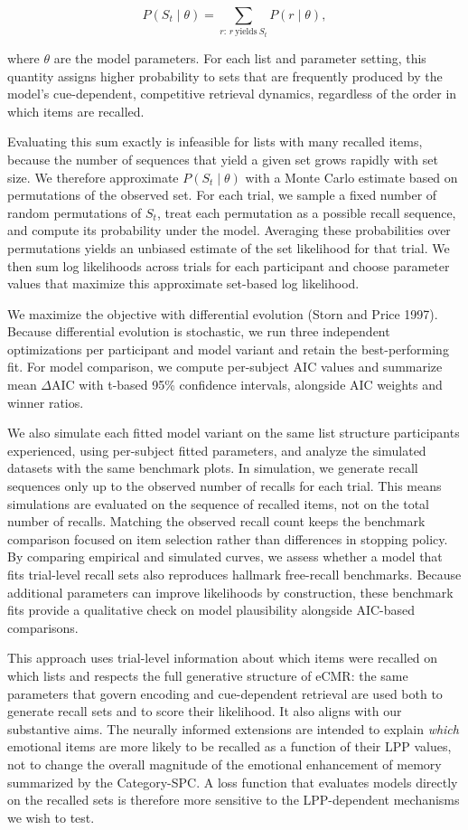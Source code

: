 \documentclass[
  letterpaper,
  DIV=11,
  numbers=noendperiod]{scrartcl}
\begin{document}
\[
P(S_t \mid \theta) = \sum_{r:\, r\ \text{yields}\ S_t} P(r \mid \theta),
\]

where \(\theta\) are the model parameters. For each list and parameter
setting, this quantity assigns higher probability to sets that are
frequently produced by the model's cue-dependent, competitive retrieval
dynamics, regardless of the order in which items are recalled.

Evaluating this sum exactly is infeasible for lists with many recalled
items, because the number of sequences that yield a given set grows
rapidly with set size. We therefore approximate \(P(S_t \mid \theta)\)
with a Monte Carlo estimate based on permutations of the observed set.
For each trial, we sample a fixed number of random permutations of
\(S_t\), treat each permutation as a possible recall sequence, and
compute its probability under the model. Averaging these probabilities
over permutations yields an unbiased estimate of the set likelihood for
that trial. We then sum log likelihoods across trials for each
participant and choose parameter values that maximize this approximate
set-based log likelihood.

We maximize the objective with differential evolution (Storn and Price
1997). Because differential evolution is stochastic, we run three
independent optimizations per participant and model variant and retain
the best-performing fit. For model comparison, we compute per-subject
AIC values and summarize mean \(\Delta\)AIC with t-based 95\% confidence
intervals, alongside AIC weights and winner ratios.

We also simulate each fitted model variant on the same list structure
participants experienced, using per-subject fitted parameters, and
analyze the simulated datasets with the same benchmark plots. In
simulation, we generate recall sequences only up to the observed number
of recalls for each trial. This means simulations are evaluated on the
sequence of recalled items, not on the total number of recalls. Matching
the observed recall count keeps the benchmark comparison focused on item
selection rather than differences in stopping policy. By comparing
empirical and simulated curves, we assess whether a model that fits
trial-level recall sets also reproduces hallmark free-recall benchmarks.
Because additional parameters can improve likelihoods by construction,
these benchmark fits provide a qualitative check on model plausibility
alongside AIC-based comparisons.

This approach uses trial-level information about which items were
recalled on which lists and respects the full generative structure of
eCMR: the same parameters that govern encoding and cue-dependent
retrieval are used both to generate recall sets and to score their
likelihood. It also aligns with our substantive aims. The neurally
informed extensions are intended to explain \emph{which} emotional items
are more likely to be recalled as a function of their LPP values, not to
change the overall magnitude of the emotional enhancement of memory
summarized by the Category-SPC. A loss function that evaluates models
directly on the recalled sets is therefore more sensitive to the
LPP-dependent mechanisms we wish to test.
\end{document}
